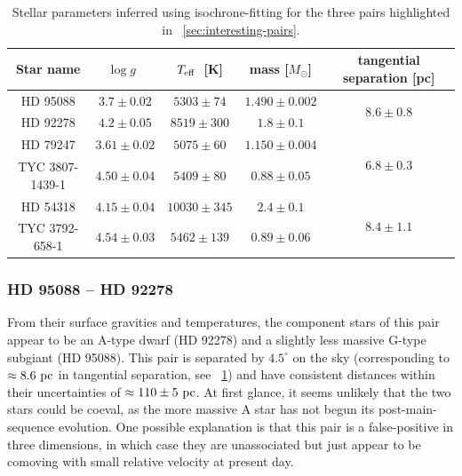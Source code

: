 \documentclass[modern, letterpaper]{aastex61}
\newcommand{\logg}{\ensuremath{\ensuremath{\log g}}}
\newcommand{\teff}{\ensuremath{\ensuremath{T_{\rm eff}}}}
\begin{document}
\begin{table}[ht]
  \begin{center}
    \begin{tabular}{ c | c | c | c | c }
      \toprule
        Star name & \logg\ & \teff\ [K] & mass [$M_\odot$] &
          tangential separation [pc]  \\
        \toprule
        HD 95088 & $3.7 \pm 0.02$ & $5303 \pm 74$ & $1.490 \pm 0.002$ &
          \multirow{2}{*}{$8.6 \pm 0.8$}\\
        HD 92278 & $4.2 \pm 0.05$ & $8519 \pm 300$ & $1.8 \pm 0.1$ &\\
        \midrule
        HD 79247 & $3.61 \pm 0.02$ & $5075 \pm 60$ & $1.150 \pm 0.004$ &
          \multirow{2}{*}{$6.8 \pm 0.3$}\\
        TYC 3807-1439-1 & $4.50 \pm 0.04$ & $5409 \pm 80$ & $0.88 \pm 0.05$ &\\
        \midrule
        HD 54318 & $4.15 \pm 0.04$ & $10030 \pm 345$ & $2.4 \pm 0.1$ &
          \multirow{2}{*}{$8.4 \pm 1.1$}\\
        TYC 3792-658-1 & $4.54 \pm 0.03$ & $5462 \pm 139$ & $0.89 \pm 0.06$ &\\
      \bottomrule
    \end{tabular}
    \caption{
      Stellar parameters inferred using isochrone-fitting for the three pairs
      highlighted in \sectionname~\ref{sec:interesting-pairs}.
      \label{tbl:highlighted-pairs}
    }
  \end{center}
\end{table}

\subsubsection{HD 95088 -- HD 92278}

From their surface gravities and temperatures, the component stars of this pair
appear to be an A-type dwarf (HD 92278) and a slightly less massive G-type
subgiant (HD 95088).
This pair is separated by $4.5^\circ$ on the sky (corresponding to $\approx
8.6~\mathrm{pc}$ in tangential separation, see \tablename~\ref{tbl:highlighted-pairs})
and have consistent distances within their uncertainties of $\approx 110 \pm
5~\mathrm{pc}$.
At first glance, it seems unlikely that the two stars could be coeval, as the
more massive A star has not begun its post-main-sequence evolution.
One possible explanation is that this pair is a false-positive in three
dimensions, in which case they are unassociated but just appear to be comoving
with small relative velocity at present day.
\end{document}
